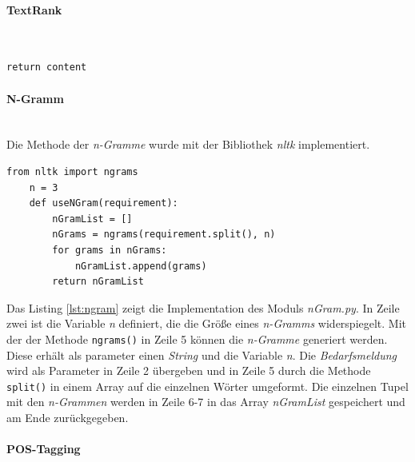 \paragraph{TextRank}\mbox{}\\
\begin{lstlisting}[caption={Implementation des Moduls \emph{textRankingAlgorithm.py}}, label=lst:textrank]
	return content
\end{lstlisting}

\paragraph{N-Gramm}\mbox{}\\
Die Methode der \emph{n-Gramme} wurde mit der Bibliothek \emph{nltk} implementiert.
\begin{lstlisting}[caption={Implementation des Moduls \emph{nGram.py}}, label=lst:ngram]
	from nltk import ngrams
	n = 3
	def useNGram(requirement):
		nGramList = []
		nGrams = ngrams(requirement.split(), n)
		for grams in nGrams:
			nGramList.append(grams)
		return nGramList
\end{lstlisting}
Das Listing \ref{lst:ngram} zeigt die Implementation des Moduls \emph{nGram.py}. In Zeile zwei ist die Variable \emph{n} definiert, die die Größe eines \emph{n-Gramms} widerspiegelt. Mit der der Methode \lstinline{ngrams()}
in Zeile 5 können die \emph{n-Gramme} generiert werden. Diese erhält als parameter einen \emph{String} und die Variable \emph{n}. Die \emph{Bedarfsmeldung} wird als Parameter in Zeile 2 übergeben und in Zeile 5 durch die Methode \lstinline{split()}
in einem Array auf die einzelnen Wörter umgeformt. Die einzelnen Tupel mit den \emph{n-Grammen} werden in Zeile 6-7 in das Array \emph{nGramList} gespeichert und am Ende zurückgegeben.
\paragraph{POS-Tagging}\mbox{}\\

